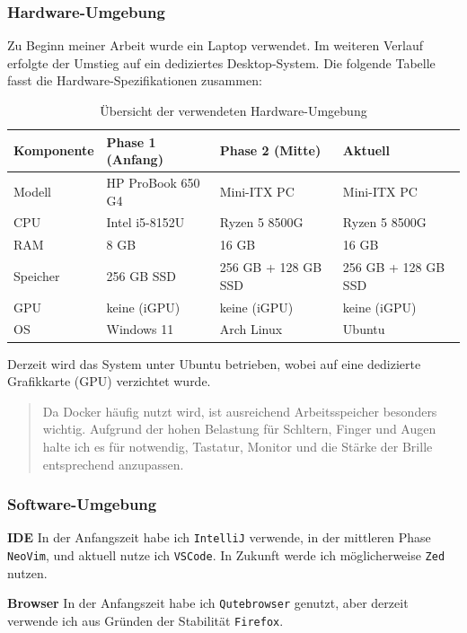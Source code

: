 \documentclass[12pt,a4paper]{report}
\begin{document}
\subsubsection{Hardware-Umgebung}

Zu Beginn meiner Arbeit wurde ein Laptop verwendet. Im weiteren Verlauf erfolgte der Umstieg auf ein dediziertes Desktop-System. Die folgende Tabelle fasst die Hardware-Spezifikationen zusammen:

\begin{table}[ht]
    \centering
    \caption{Übersicht der verwendeten Hardware-Umgebung}
    \begin{tabular}{llll}
        \hline
        Komponente & Phase 1 (Anfang) & Phase 2 (Mitte) & Aktuell \\ \hline
        Modell & HP ProBook 650 G4 & Mini-ITX PC & Mini-ITX PC \\
        CPU & Intel i5-8152U & Ryzen 5 8500G & Ryzen 5 8500G \\
        RAM & 8 GB & 16 GB & 16 GB \\
        Speicher & 256 GB SSD & 256 GB + 128 GB SSD & 256 GB + 128 GB SSD \\
        GPU & keine (iGPU) & keine (iGPU) & keine (iGPU) \\
        OS & Windows 11 & Arch Linux & Ubuntu \\ \hline
    \end{tabular}
\end{table}

Derzeit wird das System unter Ubuntu betrieben, wobei auf eine dedizierte Grafikkarte (GPU) verzichtet wurde.

\begin{quote}
Da Docker häufig nutzt wird, ist ausreichend Arbeitsspeicher besonders wichtig.
Aufgrund der hohen Belastung für Schltern, Finger und Augen halte ich es für notwendig, Tastatur, Monitor und die Stärke der Brille entsprechend anzupassen.
\end{quote}    

\subsubsection{ Software-Umgebung }
\textbf{ IDE }
In der Anfangszeit habe ich \texttt{IntelliJ} verwende, in der mittleren Phase \texttt{NeoVim}, und aktuell nutze ich \texttt{VSCode}.
In Zukunft werde ich möglicherweise \texttt{Zed} nutzen.

\textbf{ Browser }
In der Anfangszeit habe ich \texttt{Qutebrowser} genutzt, aber derzeit verwende ich aus Gründen der Stabilität \texttt{Firefox}.
\end{document}
